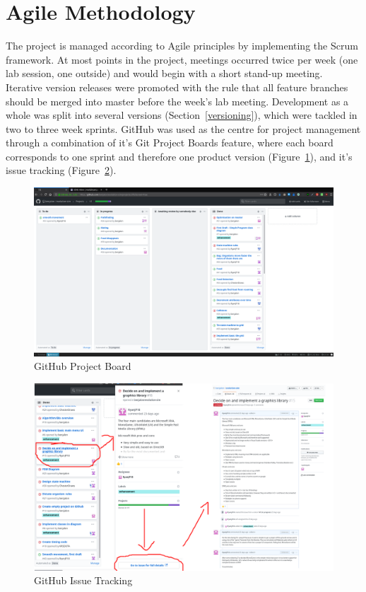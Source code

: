 \documentclass[a4paper, oneside, 11pt]{report}
\begin{document}
\section{Agile Methodology}\label{projectmanagement}
The project is managed according to Agile principles by implementing the Scrum framework. At most points in the project, meetings occurred twice per week (one lab session, one outside) and would begin with a short stand-up meeting. Iterative version releases were promoted with the rule that all feature branches should be merged into master before the week's lab meeting. Development as a whole was split into several versions (Section~\ref{versioning}), which were tackled in two to three week sprints. GitHub was used as the centre for project management through a combination of it's Git Project Boards feature, where each board corresponds to one sprint and therefore one product version (Figure~\ref{gitboard}), and it's issue tracking (Figure~\ref{gitissue}). 

\begin{figure}[H]
	\caption{GitHub Project Board}\label{gitboard}
	\centering
	\includegraphics[width=1\textwidth]{gitproj}
\end{figure}

\begin{figure}[H]
	\caption{GitHub Issue Tracking}\label{gitissue}
	\centering
	\includegraphics[width=1\textwidth]{gitissuetrack}
\end{figure}
\end{document}
